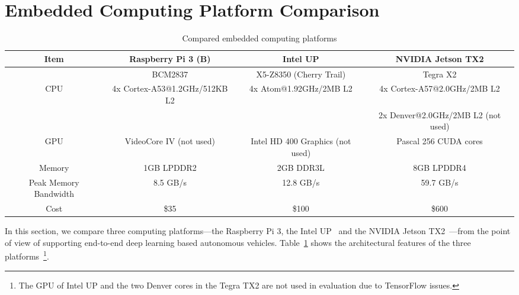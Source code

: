 
%

\section{Embedded Computing Platform Comparison}\label{sec:comparison}



\begin{table}[h]
  \centering
  \begin{adjustbox}{width=1\textwidth}
  \begin{tabular}{|c|c|c|c|}
    \hline
    Item    & Raspberry Pi 3 (B)   & Intel UP                  & NVIDIA Jetson TX2\\
    \hline
            & BCM2837              & X5-Z8350 (Cherry Trail)   & Tegra X2 \\
    CPU     & 4x Cortex-A53@1.2GHz/512KB L2  &
              4x Atom@1.92GHz/2MB L2 &
              4x Cortex-A57@2.0GHz/2MB L2 \\
            &              &              & 2x Denver@2.0GHz/2MB L2 (not used)  \\
    \hline
    GPU     &  VideoCore IV (not used)    &
               Intel HD 400 Graphics (not used) &
               Pascal 256 CUDA cores   \\
    \hline
    Memory  & 1GB LPDDR2   &  2GB DDR3L     & 8GB LPDDR4              \\
    \hline
	Peak Memory Bandwidth & 8.5 GB/s & 12.8 GB/s & 59.7 GB/s \\
	\hline
	Cost  & \$35 & \$100 & \$600 \\
	\hline
  \end{tabular}
  \end{adjustbox}
  \caption{Compared embedded computing platforms}
  \label{tbl:platforms}
\end{table}

In this section, we compare three computing platforms---the Raspberry
Pi 3, the Intel UP~\cite{intelup} and the NVIDIA Jetson
TX2~\cite{nvidiajetson}---from the point of view of supporting
end-to-end deep learning based autonomous vehicles. 
Table~\ref{tbl:platforms} shows the architectural features of the three
platforms~\footnote{The GPU of Intel UP and the two Denver cores in the
  Tegra TX2 are not used in evaluation due to TensorFlow issues.}.
  
